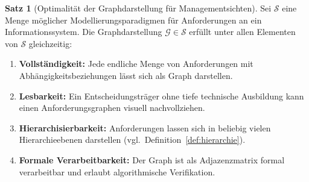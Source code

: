 ﻿\documentclass[a4paper,12pt]{report}
\theoremstyle{definition}
\newtheorem{satz}{Satz}[section]
\begin{document}
\begin{satz}[Optimalität der Graphdarstellung für Managementsichten]
\label{satz:graphoptimal}
Sei $\mathcal{S}$ eine Menge möglicher Modellierungsparadigmen für Anforderungen an ein
Informationssystem. Die Graphdarstellung
$\mathcal{G} \in \mathcal{S}$ erfüllt unter allen Elementen von $\mathcal{S}$ gleichzeitig:
\begin{enumerate}
  \item \textbf{Vollständigkeit:} Jede endliche Menge von Anforderungen mit
        Abhängigkeitsbeziehungen lässt sich als Graph darstellen.
  \item \textbf{Lesbarkeit:} Ein Entscheidungsträger ohne tiefe technische Ausbildung kann
        einen Anforderungsgraphen visuell nachvollziehen.
  \item \textbf{Hierarchisierbarkeit:} Anforderungen lassen sich in beliebig vielen
        Hierarchieebenen darstellen (vgl.\ Definition~\ref{def:hierarchie}).
  \item \textbf{Formale Verarbeitbarkeit:} Der Graph ist als Adjazenzmatrix formal
        verarbeitbar und erlaubt algorithmische Verifikation.
\end{enumerate}
\end{satz}
\end{document}
